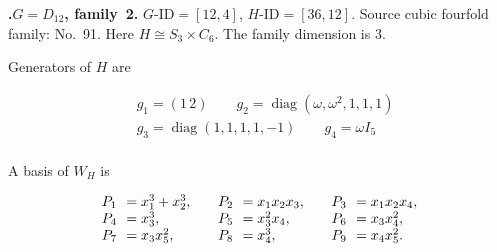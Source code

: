 \documentclass[12pt]{amsart}
\makeatletter
\numberwithin{equation}{section}
\theoremstyle{plain}
\theoremstyle{definition}
\theoremstyle{remark}
\DeclareMathOperator{\diag}{diag}
\newcommand{\PBasisLabel}[1]{\mathrlap{P_{#1}}\phantom{P_{99}}}
\newenvironment{SecEightAlignedBasis}[1]{%
  \begingroup\renewcommand{\arraystretch}{1.18}%
  \[\begin{array}{@{}#1@{}}%
}{\end{array}\]\endgroup}
\newenvironment{familydisplay}{%
  \begingroup
  \setlength{\arraycolsep}{1.35pt}%
  \renewcommand{\arraystretch}{0.96}%
  \setlength{\jot}{2pt}%
}{\endgroup}
\makeatother
\begin{document}
\par{}\medskip\noindent\textbf{.\enspace $G=D_{12}$, family~2.}\label{fam:threefold-no-21}
$G\text{-ID}=[12,4]$, $H\text{-ID}=[36,12]$.
Source cubic fourfold family: No.~91.  Here
$H\cong S_3\times C_6$.
The family dimension is $3$.
\par\smallskip\noindent Generators of $H$ are\par\nopagebreak
\begin{familydisplay}
\begin{align*}
&g_{1}=(1\,2)
\qquad g_{2}=\diag(\omega,\omega^2,1,1,1)\\
&g_{3}=\diag(1,1,1,1,-1)
\qquad g_{4}=\omega I_5\\
\end{align*}
\end{familydisplay}
\par\smallskip\noindent A basis of $W_H$ is\par\nopagebreak
\begin{familydisplay}
\begin{SecEightAlignedBasis}{l@{\qquad}l@{\qquad}l}
\PBasisLabel{1}=x_{1}^{3}+x_{2}^{3}, & \PBasisLabel{2}=x_{1}x_{2}x_{3}, & \PBasisLabel{3}=x_{1}x_{2}x_{4},\\
\PBasisLabel{4}=x_{3}^{3}, & \PBasisLabel{5}=x_{3}^{2}x_{4}, & \PBasisLabel{6}=x_{3}x_{4}^{2},\\
\PBasisLabel{7}=x_{3}x_{5}^{2}, & \PBasisLabel{8}=x_{4}^{3}, & \PBasisLabel{9}=x_{4}x_{5}^{2}.
\end{SecEightAlignedBasis}
\end{familydisplay}
\end{document}
